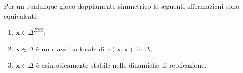 \begin{prop}
    Per un qualunque gioco doppiamente simmetrico le seguenti affermazioni sono equivalenti:
    \begin{enumerate}
        \item $\mathbf{x} \in \Delta^{ESS}$;
        \item $\mathbf{x} \in \Delta$ è un massimo locale di $u(\mathbf{x}, \mathbf{x})$ in $\Delta$;
        \item $\mathbf{x} \in \Delta$ è asintoticamente stabile nelle dinamiche di replicazione.
    \end{enumerate}
\end{prop}


